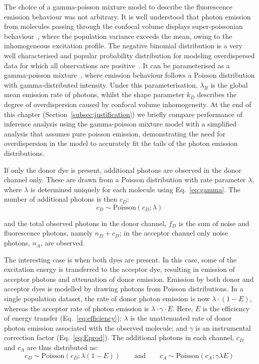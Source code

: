 The choice of a gamma-poisson mixture model to describe the fluorescence emission behaviour was not arbitrary. It is well understood that photon emission from molecules passing through the confocal volume displays super-poissonian behaviour~\cite{chen99}, where the population variance exceeds the mean, owing to the inhomogeneous excitation profile. The negative binomial distribution is a very well characterised and popular probability distribution for modeling overdispersed data for which all observations are positive~\cite{lloydsmith07, bliss53}. It can be parameterised as a gamma-poisson mixture~\cite{lloydsmith07}, where emission behaviour follows a Poisson distribution with gamma-distributed intensity. Under this parameterisation, $\lambda_B$ is the global mean emission rate of photons, whilst the shape parameter $k_D$ describes the degree of overdispersion caused by confocal volume inhomogeneity. At the end of this chapter (Section~\ref{subsec:justification}) we briefly compare performance of inference analysis using the gamma-poisson mixture model with a simplified analysis that assumes pure poisson emission, demonstrating the need for overdispersion in the model to accurately fit the tails of the photon emission distributions.  

If only the donor dye is present, additional photons are observed in the donor channel only. These are drawn from a Poisson distribution with rate parameter $\lambda$, where $\lambda$ is determined uniquely for each molecule using Eq.~\ref{eq:gamma}. The number of additional photons is then $c_D$:
\begin{equation}
c_D \sim \text{Poisson}(c_{D}; \lambda)
\end{equation}

and the total observed photons in the donor channel, $f_D$ is the sum of noise and fluorescence photons, namely $n_D + c_D$; in the acceptor channel only noise photons, $n_A$, are observed.

The interesting case is when both dyes are present.  In this case, some of the excitation energy is transferred to the acceptor dye, resulting in emission of acceptor photons and attenuation of donor emission.  Emission by both donor and acceptor dyes is modelled by drawing photons from Poisson distributions. In a single population dataset, the rate of donor photon emission is now $\lambda\cdot(1-E)$, whereas the acceptor rate of photon emission is $\lambda \cdot \gamma \cdot E$. Here, $E$ is the efficiency of energy transfer (Eq.~\ref{eq:efficiency}); $\lambda$ is the unattenuated rate of donor photon emission associated with the observed molecule; and $\gamma$ is an instrumental correction factor (Eq.~\ref{eq:Eprod}). The additional photons in each channel, $c_D$ and $c_A$ are thus distributed as:
\begin{equation}
c_D \sim \text{Poisson}(c_D; \lambda (1-E)) \qquad \text{and} \qquad c_A \sim \text{Poisson}(c_A; \gamma \lambda E)
\end{equation}

